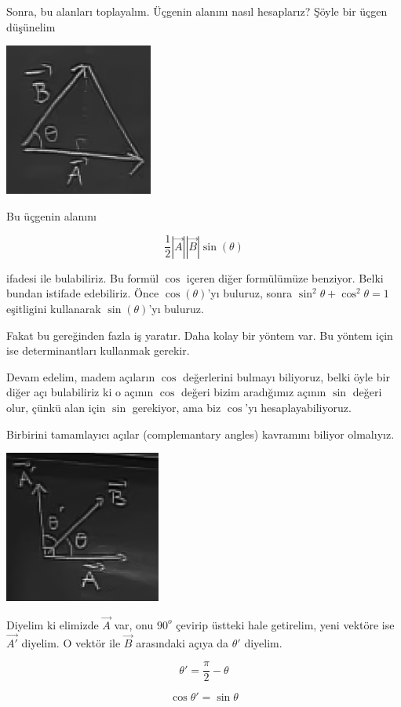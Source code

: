 \documentclass[12pt,fleqn]{article}\usepackage{../../common}
\begin{document}
Sonra, bu alanları toplayalım. Üçgenin alanını nasıl hesaplarız? Şöyle bir
üçgen düşünelim

\includegraphics[height=5cm]{2_5.png}

Bu üçgenin alanını

$$ \frac{1}{2}|\vec{A}||\vec{B}|\sin(\theta) $$

ifadesi ile bulabiliriz. Bu formül $\cos$ içeren diğer formülümüze benziyor.
Belki bundan istifade edebiliriz. Önce $\cos(\theta)$'yı buluruz, sonra
$\sin^2\theta + \cos^2\theta = 1$ eşitligini kullanarak $\sin(\theta)$'yı
buluruz.

Fakat bu gereğinden fazla iş yaratır. Daha kolay bir yöntem var. Bu yöntem için
ise determinantları kullanmak gerekir.

Devam edelim, madem açıların $\cos$ değerlerini bulmayı biliyoruz, belki öyle
bir diğer açı bulabiliriz ki o açının $\cos$ değeri bizim aradığımız açının
$\sin$ değeri olur, çünkü alan için $\sin$ gerekiyor, ama biz $\cos$'yı
hesaplayabiliyoruz.

Birbirini tamamlayıcı açılar (complemantary angles) kavramını biliyor olmalıyız.

\includegraphics[height=5cm]{2_6.png}

Diyelim ki elimizde $\vec{A}$ var, onu $90^o$ çevirip üstteki hale getirelim,
yeni vektöre ise $\vec{A'}$ diyelim. O vektör ile $\vec{B}$ arasındaki açıya da
$\theta'$ diyelim.

$$ \theta' = \frac{\pi}{2} - \theta $$

$$ \cos \theta' = \sin \theta $$
\end{document}
